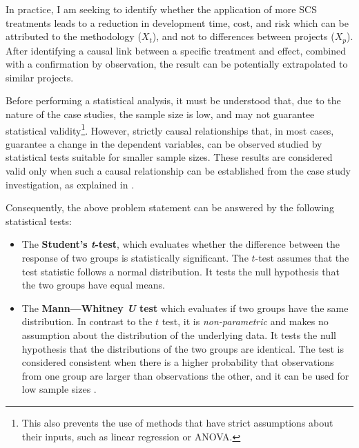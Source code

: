 \documentclass[a4paper,nobib,justified,final]{tufte-book}
\begin{document}
In practice, I am seeking to identify whether the application of more \acs{SCS} treatments leads to a reduction in development time, cost, and risk which can be attributed to the methodology (\(X_t\)), and not to differences between projects (\(X_p \)). After identifying a causal link between a specific treatment and effect, combined with a confirmation by observation, the result can be potentially extrapolated to similar projects.

Before performing a statistical analysis, it must be understood that, due to the nature of the case studies, the sample size is low, and may not guarantee statistical validity\footnote{This also prevents the use of methods that have strict assumptions about their inputs, such as linear regression or \acs{ANOVA}.}. However, strictly causal relationships that, in most cases, guarantee a change in the dependent variables, can be observed studied by statistical tests suitable for smaller sample sizes. These results are considered valid only when such a causal relationship can be established from the case study investigation, as explained in .

Consequently, the above problem statement can be answered by the following statistical tests: \autocite{chiccoSimpleGuideUse2025}
\begin{itemize}[itemsep=-2ex]
	\item The \textbf{Student's \emph{t}-test}, which evaluates whether the difference between the response of two groups is statistically significant. The \(t\)-test assumes that the test statistic follows a normal distribution. It tests the null hypothesis that the two groups have equal means.
	\item The \textbf{Mann---Whitney \emph{U} test} which evaluates if two groups have the same distribution. In contrast to the \(t\) test, it is \emph{non-parametric} and makes no assumption about the distribution of the underlying data. It tests the null hypothesis that the distributions of the two groups are identical.
	The test is considered consistent when there is a higher probability that observations from one group are larger than observations the other, and it can be used for low sample sizes \autocite{happOptimalSampleSize2019}.
\end{itemize}
\end{document}
